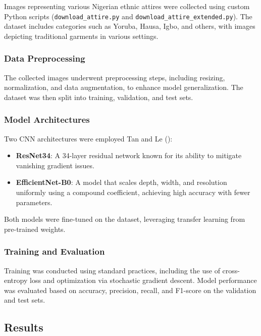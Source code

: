 \documentclass[
  letterpaper,
  DIV=11,
  numbers=noendperiod]{scrartcl}
\begin{document}
Images representing various Nigerian ethnic attires were collected using
custom Python scripts (\texttt{download\_attire.py} and
\texttt{download\_attire\_extended.py}). The dataset includes categories
such as Yoruba, Hausa, Igbo, and others, with images depicting
traditional garments in various settings.

\subsubsection{Data Preprocessing}\label{data-preprocessing}

The collected images underwent preprocessing steps, including resizing,
normalization, and data augmentation, to enhance model generalization.
The dataset was then split into training, validation, and test sets.

\subsubsection{Model Architectures}\label{model-architectures}

Two CNN architectures were employed Tan and Le
():

\begin{itemize}
\item
  \textbf{ResNet34}: A 34-layer residual network known for its ability
  to mitigate vanishing gradient issues.
\item
  \textbf{EfficientNet-B0}: A model that scales depth, width, and
  resolution uniformly using a compound coefficient, achieving high
  accuracy with fewer parameters.
\end{itemize}

Both models were fine-tuned on the dataset, leveraging transfer learning
from pre-trained weights.

\subsubsection{Training and Evaluation}\label{training-and-evaluation}

Training was conducted using standard practices, including the use of
cross-entropy loss and optimization via stochastic gradient descent.
Model performance was evaluated based on accuracy, precision, recall,
and F1-score on the validation and test sets.

\subsection{Results}\label{results}
\end{document}
